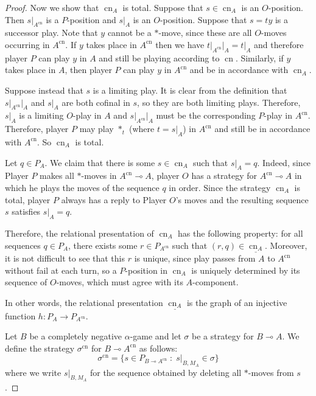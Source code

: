 \documentclass[11pt]{article} %
\theoremstyle{plain} %
\theoremstyle{definition} %
\theoremstyle{note}
\theoremstyle{exercisestyle}
\renewcommand{\implies}{\multimap}
\newcommand{\suchthat}{\;\colon\;}
\newcommand{\grel}[1]{\underline{#1}}
\DeclareMathOperator{\cn}{cn}
\begin{document}
\begin{proof}
  Now we show that $\cn_A$ is total.  Suppose that $s\in\cn_A$ is an $O$-position.  Then $s\vert_{A^{\cn}}$ is a $P$-position and $s\vert_A$ is an $O$-position.  Suppose that $s=ty$ is a successor play.  Note that $y$ cannot be a $*$-move, since these are all $O$-moves occurring in $A^{\cn}$.  If $y$ takes place in $A^{\cn}$ then we have $t\vert_{A^{\cn}}\vert_A=t\vert_A$ and therefore player $P$ can play $y$ in $A$ and still be playing according to $\cn$.  Similarly, if $y$ takes place in $A$, then player $P$ can play $y$ in $A^{\cn}$ and be in accordance with $\cn_A$.  

  Suppose instead that $s$ is a limiting play.  It is clear from the definition that $s\vert_{A^{\cn}}\vert_A$ and $s\vert_A$ are both cofinal in $s$, so they are both limiting plays.  Therefore, $s\vert_A$ is a limiting $O$-play in $A$ and $s\vert_{A^{\cn}}\vert_A$ must be the corresponding $P$-play in $A^{\cn}$.  Therefore, player $P$ may play $*_t$ (where $t=s\vert_A$) in $A^{\cn}$ and still be in accordance with $A^{\cn}$.  So $\cn_A$ is total.

  Let $q\in P_A$.  We claim that there is some $s\in\cn_A$ such that $s\vert_A=q$.  Indeed, since Player $P$ makes all $*$-moves in $A^{\cn}\implies A$, player $O$ has a strategy for $A^{\cn}\implies A$ in which he plays the moves of the sequence $q$ in order.  Since the strategy $\cn_A$ is total, player $P$ always has a reply to Player $O$'s moves and the resulting sequence $s$ satisfies $s\vert_A=q$.  

  Therefore, the relational presentation of $\cn_A$ has the following property: for all sequences $q\in P_A$, there exists some $r\in P_{A^{\cn}}$ such that $(r,q)\in\grel{\cn_A}$.  Moreover, it is not difficult to see that this $r$ is unique, since play passes from $A$ to $A^{\cn}$ without fail at each turn, so a $P$-position in $\cn_A$ is uniquely determined by its sequence of $O$-moves, which must agree with its $A$-component.  

  In other words, the relational presentation $\grel{\cn_A}$ is the graph of an injective function $h\colon P_A\to P_{A^{\cn}}$.

  Let $B$ be a completely negative $\alpha$-game and let $\sigma$ be a strategy for $B\implies A$.  We define the strategy $\sigma^{\cn}$ for $B\implies A^{\cn}$ as follows:
  \[
    \sigma^{\cn} = \{s\in P_{B\implies A^{\cn}}\suchthat s\vert_{B,M_A}\in\sigma\}
    \]
  where we write $s\vert_{B,M_A}$ for the sequence obtained by deleting all $*$-moves from $s$.  


\end{proof}
\end{document}
